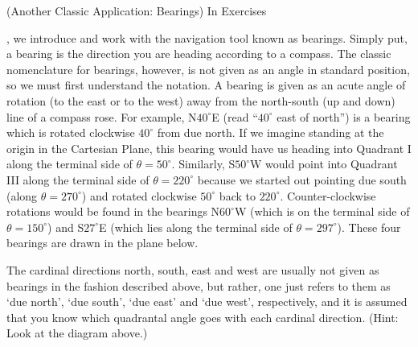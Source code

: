 {
\label{bearings}
(Another Classic Application: Bearings)  In Exercises}
{,  we introduce and work with the navigation tool known as bearings.  Simply put, a bearing is the direction you are heading according to a compass.  The classic nomenclature for bearings, however, is not given as an angle in standard position, so we must first understand the notation.  A bearing is given as an acute angle of rotation (to the east or to the west) away from the north-south (up and down) line of a compass rose.  For example, N$40^{\circ}$E (read ``$40^{\circ}$ east of north'') is a bearing which is rotated clockwise $40^{\circ}$ from due north.  If we imagine standing at the origin in the Cartesian Plane, this bearing would have us heading into Quadrant I along the terminal side of $\theta = 50^{\circ}$.  Similarly, S$50^{\circ}$W would point into Quadrant III along the terminal side of $\theta = 220^{\circ}$ because we started out pointing due south (along $\theta = 270^{\circ}$) and rotated clockwise $50^{\circ}$ back to $220^{\circ}$.  Counter-clockwise rotations would be found in the bearings N$60^{\circ}$W (which is on the terminal side of $\theta = 150^{\circ}$) and S$27^{\circ}$E (which lies along the terminal side of $\theta = 297^{\circ}$).  These four bearings are drawn in the plane below.
\begin{center}
\end{center}
The cardinal directions north, south, east and west are usually not given as bearings in the fashion described above, but rather, one just refers to them as `due north', `due south', `due east' and `due west', respectively, and it is assumed that you know which quadrantal angle goes with each cardinal direction.  (Hint: Look at the diagram above.)  }
